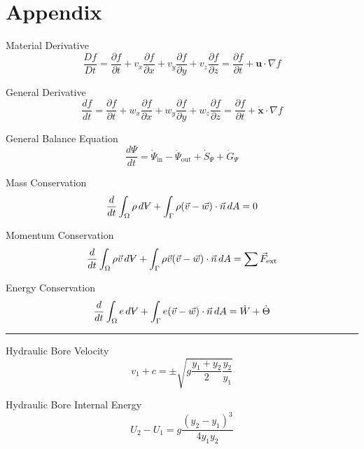 \documentclass[twoside]{article}
\makeatletter
\DeclareRobustCommand{\vol}{\text{\volumedash}V}
\newcommand{\volumedash}{%
	\makebox[0pt][l]{%
		\ooalign{\hfil\hphantom{$\m@th V$}\hfil\cr\kern0.16em\rotatebox{27.5}{\textbf{--}}\hfil\cr}%
	}%
}
\numberwithin{equation}{section}
\makeatother
\begin{document}
	\newpage
	
	\section{Appendix}
	
	Material Derivative
	\begin{equation*}
		\frac{Df}{Dt} = \frac{\partial f}{\partial t}+v_x \frac{\partial f}{\partial x}+v_y \frac{\partial f}{\partial y}+v_z \frac{\partial f}{\partial z} = \frac{\partial f}{\partial t}+\textbf{u} \cdot \nabla f
	\end{equation*}
	
	General Derivative
	\begin{equation*}
		\frac{df}{dt} = \frac{\partial f}{\partial t}+w_x\frac{\partial f}{\partial x} +w_y\frac{\partial f}{\partial y}+w_z\frac{\partial f}{\partial z} = \frac{\partial f}{\partial t}+\dot{\textbf{x}} \cdot \nabla f
	\end{equation*}
	
	General Balance Equation
	\begin{equation*}
		\frac{d\Psi}{dt} = \dot{\Psi}_{\text{in}}-\dot{\Psi}_{\text{out}}+\dot{S}_\Psi+\dot{G}_\Psi
	\end{equation*}
	
	Mass Conservation
	\begin{equation*}
		\frac{d}{dt} \int_\Omega \rho \, d\vol+\int_\Gamma \rho (\vec{v}-\vec{w}) \cdot \vec{n} \, dA = 0
	\end{equation*}
	
	Momentum Conservation
	\begin{equation*}
		\frac{d}{dt} \int_\Omega \rho \vec{v} \, d\vol+\int_\Gamma \rho \vec{v} (\vec{v}-\vec{w}) \cdot \vec{n} \, dA = \sum \vec{F}_{\text{ext}}
	\end{equation*}
	
	Energy Conservation
		\begin{equation*}
		\frac{d}{dt} \int_\Omega e \, d\vol+\int_\Gamma e(\vec{v}-\vec{w}) \cdot \vec{n} \, dA = \dot{W}+\dot{\Theta}
	\end{equation*}
	
	\noindent\rule{\textwidth}{0.5pt}
	
	Hydraulic Bore Velocity
	\begin{equation*}
		v_1+c = \pm \sqrt{g\frac{y_1+y_2}{2} \frac{y_2}{y_1}}
	\end{equation*}
	
	Hydraulic Bore Internal Energy
	\begin{equation*}
		U_2-U_1 = g\frac{(y_2-y_1)^3}{4y_1y_2}
	\end{equation*}
	
\end{document}
